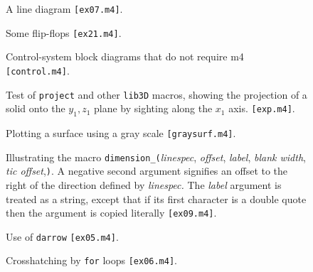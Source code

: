 \documentclass[11pt]{article}
\newcommand{\src}[1]{{\tt [#1]}}
\newcommand{\makepic}{\box\graph} %
\begin{document}
  \begin{figure}[h!t]
    \centerline{ \makepic}
    \caption{A line diagram
    \src{ex07.m4}.}
  \end{figure}

  \begin{figure}[h!t]
    \centerline{ \makepic}
    \caption{Some flip-flops
    \src{ex21.m4}.}
  \end{figure}

  \begin{figure}[h!t]
    \centerline{ \makepic}
    \caption{Control-system block diagrams that do not require m4
    \src{control.m4}.}
  \end{figure}
  \clearpage

  \begin{figure}[h!t]
    \centerline{ \makepic}
    \caption{Test of {\tt project} and other {\tt lib3D}
      macros, showing the projection of a solid onto
      the $y_1,z_1$ plane by sighting along the $x_1$ axis.
  \src{exp.m4}.}
  \end{figure}

  \begin{figure}[h!t]
    \centerline{ \makepic}
    \caption{Plotting a surface using a gray scale
  \src{graysurf.m4}.}
  \end{figure}

  \begin{figure}[h!t]
    \centerline{ \makepic}
    \caption{Illustrating the macro
      {\tt dimension\_(}{\sl linespec}, {\sl offset}, {\sl label},
      {\sl blank width}, {\sl tic offset},{\tt <-|->)}.
      A negative second argument signifies an offset to the right of the
      direction defined by {\sl linespec.} The {\sl label} argument is
      treated as a string, except that if its first character is a double
      quote then the argument is copied literally
    \src{ex09.m4}.}
  \end{figure}

  \begin{figure}[h!t]
    \centerline{ \makepic}
    \caption{Use of {\tt darrow}
    \src{ex05.m4}.}
  \end{figure}
\clearpage

  \begin{figure}[h!t]
    \centerline{ \makepic}
    \caption{Crosshatching by {\tt for} loops
    \src{ex06.m4}.}
  \end{figure}
\end{document}
